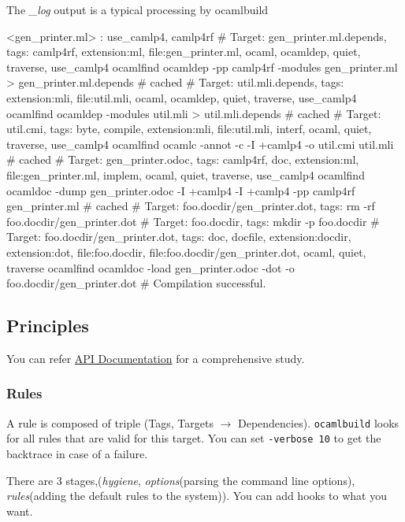 The \textit{\_log} output is a typical processing by ocamlbuild

\begin{bashcode}
  <gen_printer.ml> : use_camlp4, camlp4rf
  # Target: gen_printer.ml.depends, tags: { camlp4rf, extension:ml, file:gen_printer.ml, ocaml, ocamldep, quiet, traverse, use_camlp4 }
ocamlfind ocamldep -pp camlp4rf -modules gen_printer.ml > gen_printer.ml.depends # cached
  # Target: util.mli.depends, tags: { extension:mli, file:util.mli, ocaml, ocamldep, quiet, traverse, use_camlp4 }
ocamlfind ocamldep -modules util.mli > util.mli.depends # cached
  # Target: util.cmi, tags: { byte, compile, extension:mli, file:util.mli, interf, ocaml, quiet, traverse, use_camlp4 }
ocamlfind ocamlc -annot -c -I +camlp4 -o util.cmi util.mli # cached
  # Target: gen_printer.odoc, tags: { camlp4rf, doc, extension:ml, file:gen_printer.ml, implem, ocaml, quiet, traverse, use_camlp4 }
ocamlfind ocamldoc -dump gen_printer.odoc -I +camlp4 -I +camlp4 -pp camlp4rf gen_printer.ml # cached
  # Target: foo.docdir/gen_printer.dot, tags: {  }
  rm -rf foo.docdir/gen_printer.dot
# Target: foo.docdir, tags: {  }
mkdir -p foo.docdir
# Target: foo.docdir/gen_printer.dot, tags: { doc, docfile, extension:docdir, extension:dot, file:foo.docdir, file:foo.docdir/gen_printer.dot, ocaml, quiet, traverse }
ocamlfind ocamldoc -load gen_printer.odoc -dot -o foo.docdir/gen_printer.dot
# Compilation successful.
\end{bashcode}

\subsection{Principles}

You can refer
\href{http://www.seas.upenn.edu/~hongboz/hongbo_zhang_files/ob/}{API
  Documentation} for a comprehensive study.

\subsubsection{Rules }

A rule is composed of triple (Tags, Targets $\rightarrow$ Dependencies).
\verb|ocamlbuild| looks for all rules that are valid for this target.
You can set \verb|-verbose 10| to get the backtrace in case of a
failure.


There are 3 stages,(\textit{hygiene}, \textit{options}(parsing the
command line options), \textit{rules}(adding the default rules to the
system)). You can add hooks to what you want.


